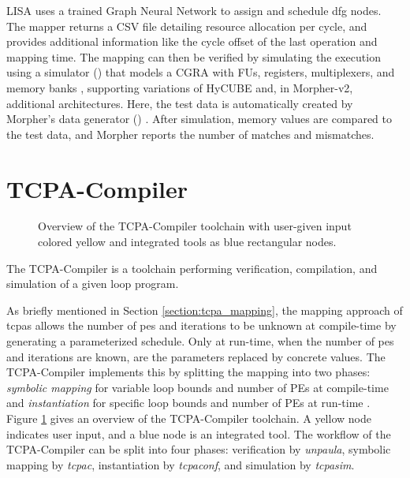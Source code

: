     LISA uses a trained Graph Neural Network to assign and schedule \ac{dfg} nodes.
    The mapper returns a CSV file detailing resource allocation per cycle, and provides additional information like the cycle offset of the last operation and mapping time.
    The mapping can then be verified by simulating the execution using a simulator () that models a CGRA with FUs, registers, multiplexers, and memory banks \cite{6_MorpherWOSET}, supporting variations of HyCUBE and, in Morpher-v2, additional architectures.
    Here, the test data is automatically created by Morpher’s data generator () \cite{3_MorpherCODAI}.
    After simulation, memory values are compared to the test data, and Morpher reports the number of matches and mismatches.

\section{TCPA-Compiler}\label{section:tcpa-compiler}
    \begin{figure}[htb]
      \centering
      \resizebox{!}{.25\textwidth}{}
      \caption{Overview of the TCPA-Compiler toolchain with user-given input colored yellow and integrated tools as blue rectangular nodes.}
      \label{fig:tcpa-compiler_framework}
    \end{figure}

The TCPA-Compiler is a toolchain performing verification, compilation, and simulation of a given loop program.

As briefly mentioned in Section \ref{section:tcpa_mapping}, the mapping approach of \acp{tcpa} allows the number of \acp{pe} and iterations to be unknown at compile-time by generating a parameterized schedule.
Only at run-time, when the number of \acp{pe} and iterations are known, are the parameters replaced by concrete values.
The TCPA-Compiler implements this by splitting the mapping into two phases: \emph{symbolic mapping} for variable loop bounds and number of PEs at compile-time and \emph{instantiation} for specific loop bounds and number of PEs at run-time \cite{15_sym_comp}.
Figure \ref{fig:tcpa-compiler_framework} gives an overview of the TCPA-Compiler toolchain.
A yellow node indicates user input, and a blue node is an integrated tool.
The workflow of the TCPA-Compiler can be split into four phases: verification by \textit{unpaula}, symbolic mapping by \textit{tcpac}, instantiation by \textit{tcpaconf}, and simulation by \textit{tcpasim}.

